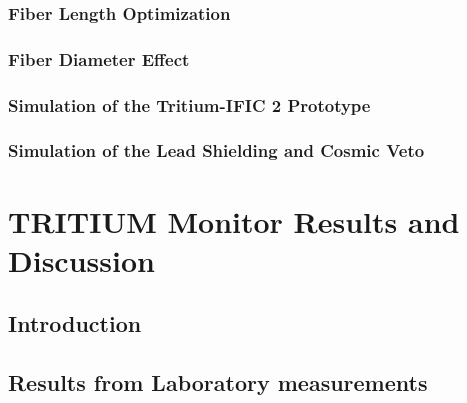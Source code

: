 \documentclass[12pt,a4paper]{book}
\begin{document}
		\subsection[Fiber Length]{Fiber Length Optimization}\label{subsec:FiberLengthSimulation}
		
				
		\subsection[Fiber Diameter]{Fiber Diameter Effect}\label{subsec:FiberDiameterSimulation}
		
		
		\subsection[Tritium-IFIC 2]{Simulation of the Tritium-IFIC 2 Prototype}\label{subsec:TritiumIFIC2Simulation}
		
		
		\subsection[Lead Shielding and Cosmic Veto]{Simulation of the Lead Shielding and Cosmic Veto}\label{subsec:LeadCosmicSimulation}
		
				
\chapter[Results and Discussion]{TRITIUM Monitor Results and Discussion}\label{chap:ResultsPrototypes}
	\section{Introduction}\label{sec:IntroResultsPrototypes}
	
	\newpage
	
	\section{Results from Laboratory measurements}\label{sec:ResultsLaboratoryPrototypes}
	
	\newpage
		
\end{document}
